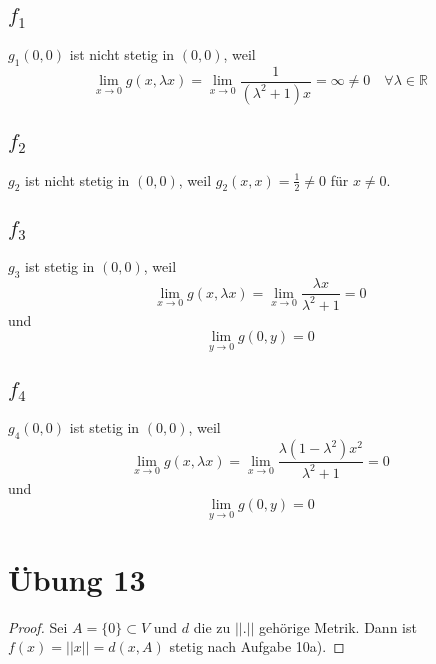\documentclass[10pt,a4paper]{article}
\begin{document}
\subsection*{$f_{1}$}

$g_{1}(0, 0)$ ist nicht stetig in $(0, 0)$, weil
\begin{equation}
\lim_{x \rightarrow 0} g(x, \lambda x) = \lim_{x \rightarrow 0} \frac{1}{(\lambda^{2} + 1)x} = \infty \ne 0 \quad \forall \lambda \in \mathbb{R}
\end{equation}

\subsection*{$f_{2}$}

$g_{2}$ ist nicht stetig in $(0, 0)$, weil $g_{2}(x, x) = \frac{1}{2} \ne 0$ für $x \ne 0$.

\subsection*{$f_{3}$}

$g_{3}$ ist stetig in $(0, 0)$, weil
\begin{equation}
\lim_{x \rightarrow 0} g(x, \lambda x) = \lim_{x \rightarrow 0} \frac{\lambda x}{\lambda^{2} + 1} = 0
\end{equation}
und
\begin{equation}
\lim_{y \rightarrow 0} g(0, y) = 0
\end{equation}

\subsection*{$f_{4}$}

$g_{4}(0, 0)$ ist stetig in $(0, 0)$, weil
\begin{equation}
\lim_{x \rightarrow 0} g(x, \lambda x) = \lim_{x \rightarrow 0} \frac{\lambda (1 - \lambda^{2}) x^{2}}{\lambda^{2} + 1} = 0
\end{equation}
und
\begin{equation}
\lim_{y \rightarrow 0} g(0, y) = 0
\end{equation}

\section*{Übung 13}

\begin{proof}
Sei $A = \{0\} \subset V$ und $d$ die zu $||.||$ gehörige Metrik.
Dann ist $f(x) = ||x|| = d(x, A)$ stetig nach Aufgabe 10a).
\end{proof}
\end{document}
